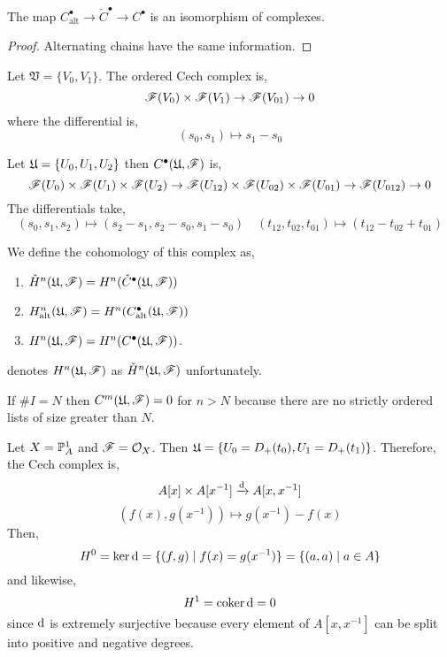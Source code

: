 \documentclass[12pt]{article}
\begin{document}
\begin{prop}
The map $C_{\text{alt}}^\bullet \to \check{C}^\bullet \to C^\bullet$ is an isomorphism of complexes.
\end{prop}

\begin{proof}
Alternating chains have the same information. 
\end{proof}

\begin{example}
Let $\mathfrak{V} = \{ V_0, V_1 \}$. The ordered Cech complex is,
\[ \F(V_0) \times \F(V_1) \to \F(V_{01}) \to 0 \]
where the differential is,
\[ (s_0, s_1) \mapsto s_1 - s_0 \]
\end{example}

\begin{example}
Let $\U = \{ U_0, U_1, U_2 \}$ then $C^\bullet(\U, \F)$ is,
\[ \F(U_0) \times \F(U_1) \times \F(U_2) \to \F(U_{12}) \times \F(U_{02}) \times \F(U_{01}) \to \F(U_{012}) \to 0 \]
The differentials take,
\[ (s_0, s_1, s_2) \mapsto (s_2 - s_1, s_2 - s_0, s_1 - s_0) \quad (t_{12}, t_{02}, t_{01}) \mapsto (t_{12} - t_{02} + t_{01}) \]
\end{example}

\begin{defn}
We define the cohomology of this complex as,
\begin{enumerate}
\item $\check{H}^n(\U, \F) = H^n(\check{C}^\bullet(\U, \F))$
\item $H^n_{\text{alt}}(\U, \F) = H^n(C^\bullet_{\text{alt}}(\U, \F))$
\item $H^n(\U, \F) = H^n(C^\bullet(\U, \F))$.
\end{enumerate}
\end{defn}

\begin{rmk}
[H] denotes $H^n(\U, \F)$ as $\check{H}^n(\U, \F)$ unfortunately.
\end{rmk}

\begin{rmk}
If $\# I = N$ then $C^m(\U, \F) = 0$ for $n > N$ because there are no strictly ordered lists of size greater than $N$.
\end{rmk}

\begin{example}
Let $X = \P^1_A$ and $\F = \struct{X}$. Then $\U = \{ U_0 = D_+(t_0), U_1 = D_+(t_1) \}$. Therefore, the Cech complex is,
\[ A[x] \times A[x^{-1}] \xrightarrow{\d} A[x, x^{-1}] \]
\[ (f(x), g(x^{-1})) \mapsto g(x^{-1}) - f(x) \]
Then,
\[ H^0 = \ker{\d} = \{ (f,g) \mid f(x) = g(x^{-1}) \} = \{ (a,a) \mid a \in A \} \]
and likewise,
\[ H^1 = \coker{\d} = 0 \]
since $\d$ is extremely surjective because every element of $A[x,x^{-1}]$ can be split into positive and negative degrees.
\end{example}
\end{document}
